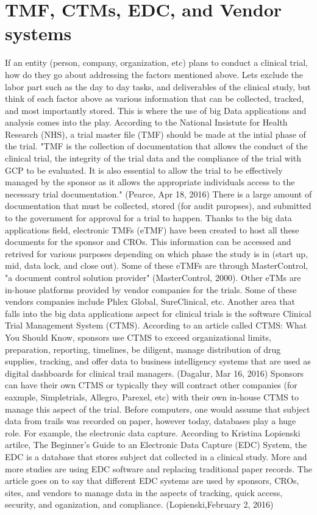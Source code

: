 \documentclass[sigconf]{acmart}
\begin{document}
{\section{TMF, CTMs, EDC, and Vendor systems}
If an entity (person, company, organization, etc) plans to conduct a clinical trial, how do they go about addressing the
factors mentioned above. Lets exclude the labor part such as the day to day tasks, and deliverables of the clinical study, but think of each factor above as various information that can be collected, tracked, and most importantly stored. 
This is where the use of big Data applications and analysis comes into the play. 
According to the National Insistute for Health Research (NHS), a trial master file (TMF) should be made at the intial phase of the trial. "TMF is the collection of documentation that allows the conduct of the clinical trial, the integrity of the trial data and the compliance of the trial with GCP to be evaluated.
It is also essential to allow the trial to be effectively managed by the sponsor as it allows the appropriate individuals access to the necessary trial documentation." (Pearce, Apr 18, 2016) 
There is a large amount of documentation that must be collected, stored (for audit puropses), and submitted to the government for approval for a trial to happen. 
Thanks to the big data applications field, electronic TMFs (eTMF) have been created to host all these documents for the sponsor and CROs. This information can be accessed and retrived for various purposes depending on which phase the study is in (start up, mid, data lock, and close out). 
Some of these eTMFs are through MasterControl, "a document control solution provider" (MasterControl, 2000). Other eTMs are in-house platforms provided by vendor companies for the trials. 
Some of these vendors companies include Phlex Global, SureClinical, etc.
Another area that falls into the big data applications aspect for clinical trials is the software Clinical Trial Management System (CTMS).
According to an article called CTMS: What You Should Know, sponsors use CTMS to exceed organizational limits, preparation, reporting, timelines, be diligent, manage distribution of drug supplies, tracking, and offer data to business intelligency systems that are used as digital dashboards for clinical trail managers. (Dagalur, Mar 16, 2016) 
Sponsors can have their own CTMS or typically they will contract other companies (for eaxmple, Simpletrials, Allegro, Parexel, etc) with their own in-house CTMS to manage this aspect of the trial. 
Before computers, one would assume that subject data from trails was recorded on paper, however today, databases play a huge role. For example, the electronic data capture.
According to Kristina Lopienski artilce, The Beginner’s Guide to an Electronic Data Capture (EDC) System, the EDC is a database that stores subject dat collected in a clinical study. 
More and more studies are using EDC software and replacing traditional paper records. 
The article goes on to say that different EDC systems are used by sponsors, CROs, sites, and vendors to manage data in the aspects of tracking, quick access, security, and oganization, and compliance. (Lopienski,February 2, 2016)


}
\end{document}
